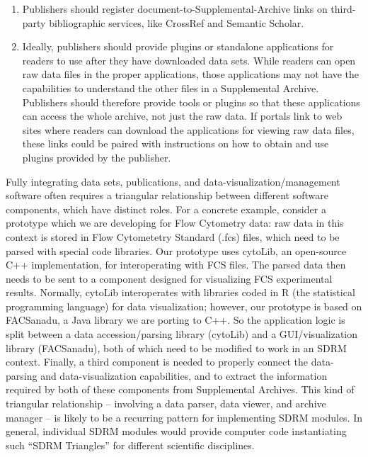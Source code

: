 \documentclass[11pt,letterpaper]{article}
\newcommand{\p}[1]{

\vspace{.7em}#1}
\newcommand{\q}[1]{{\fontfamily{qcr}\selectfont ``}#1{\fontfamily{qcr}\selectfont ''}}
\begin{document}
{{\begin{enumerate}
\begin{enumerate}
\item{}  Handle requests for microcitations generated by document signals, the same signals used for inter-application networking between document viewers and scientific applications;

\item{}  Provide API endpoints for finding and using plugins (discussed below).
\end{enumerate}

\item{}  Publishers should register document-to-Supplemental-Archive links on third-party bibliographic services, like CrossRef and Semantic Scholar.

\item{}  Ideally, publishers should provide plugins or standalone applications for readers to use after they have downloaded data sets.  While readers can open raw data files in the proper applications, those applications may not have the capabilities to understand the other files in a Supplemental Archive.  Publishers should therefore provide tools or plugins so that these applications can access the whole archive, not just the raw data.  If portals link to web sites where readers can download the applications for viewing raw data files, these links could be paired with instructions on how to obtain and use plugins provided by the publisher.
\end{enumerate} 
}

\p{Fully integrating data sets, publications, and data-visualization/management software often requires a triangular relationship between different software components, which have distinct roles.  For a concrete example, consider a prototype which we are developing for Flow Cytometry data: raw data in this context is stored in Flow Cytometetry Standard (.fcs) files, which need to be parsed with special code libraries.  Our prototype uses cytoLib, an open-source C++ implementation, for interoperating with FCS files.  The parsed data then needs to be sent to a component designed for visualizing FCS experimental results.  Normally, cytoLib interoperates with libraries coded in R (the statistical programming language) for data visualization; however, our prototype is based on FACSanadu, a Java library we are porting to C++.  So the application logic is split between a data accession/parsing library (cytoLib) and a GUI/visualization library (FACSanadu), both of which need to be modified to work in an SDRM context.  Finally, a third component is needed to properly connect the data-parsing and data-visualization capabilities, and to extract the information required by both of these components from Supplemental Archives.  This kind of triangular relationship -- involving a data parser, data viewer, and archive manager -- is likely to be a recurring pattern for implementing SDRM modules.  In general, individual SDRM modules would provide computer code instantiating such \q{SDRM Triangles} for different scientific disciplines.  }

}
\end{document}
